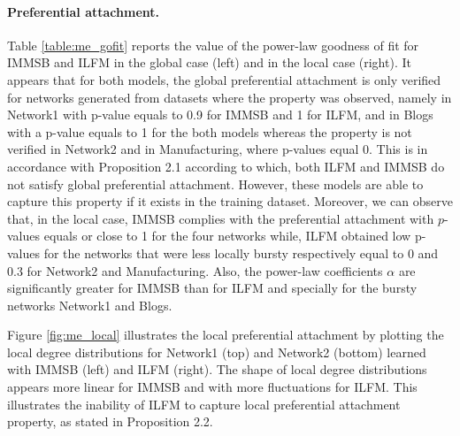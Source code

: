 \paragraph{Preferential attachment.} Table \ref{table:me_gofit} reports the value of the power-law goodness of fit for IMMSB and ILFM in the global case (left) and in the local case (right). It appears that for both models, the global preferential attachment is only verified for networks generated from datasets where the property was observed, namely in Network1 with p-value equals to 0.9 for IMMSB and 1 for ILFM, and in Blogs with a p-value equals to 1 for the both models whereas the property is not verified in Network2 and in Manufacturing, where p-values equal 0. This is in accordance with Proposition 2.1 according to which, both ILFM and IMMSB do not satisfy global preferential attachment. However, these models are able to capture this property if it exists in the training dataset.  Moreover, we can observe that, in the local case, IMMSB complies with the preferential attachment with $p$-values equals or close to 1 for the four networks while, ILFM obtained low p-values for the networks that were less locally bursty respectively equal to 0 and 0.3 for Network2 and Manufacturing. Also, the power-law coefficients $\alpha$ are significantly greater for IMMSB than for ILFM and specially for the bursty networks Network1 and Blogs.

Figure \ref{fig:me_local} illustrates the local preferential attachment by plotting the local degree distributions for Network1 (top) and Network2 (bottom) learned with IMMSB (left) and ILFM (right). The shape of local degree distributions appears more linear for IMMSB and with more fluctuations for ILFM. This illustrates the inability  of ILFM to capture local preferential attachment property,  as stated in Proposition 2.2. 

